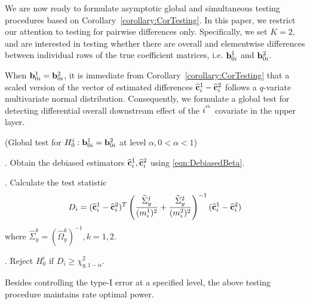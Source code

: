 We are now ready to formulate asymptotic global and simultaneous testing procedures based on Corollary~\ref{corollary:CorTesting}. In this paper, we restrict our attention to testing for pairwise differences only. Specifically, we set $K=2$, and are interested in testing whether there are overall and elementwise differences between individual rows of the true coefficient matrices, i.e. ${\bf{b}}_{0i}^1$ and ${\bf{b}}_{0i}^2$.

When ${\bf{b}}_{0 i}^1 = {\bf{b}}_{0 i}^2$, it is immediate from Corollary~\ref{corollary:CorTesting} that a scaled version of the vector of estimated differences $\widehat {{\bf{c}}}_i^1 - \widehat {{\bf{c}}}_i^2$ follows a $q$-variate multivariate normal distribution. Consequently, we formulate a global test for detecting differential overall downstream effect of the $i^{\operatorname*{^{\text{th}}}}$ covariate in the upper layer.

\begin{Algorithm}\label{algo:AlgoGlobalTest}
(Global test for $H_0^i: {\bf{b}}_{0 i}^1 = {\bf{b}}_{0 i}^2$ at level $\alpha, 0< \alpha< 1$)

. Obtain the debiased estimators $\widehat {{\bf{c}}}_i^1, \widehat {{\bf{c}}}_i^2$ using \eqref{eqn:DebiasedBeta}.

. Calculate the test statistic
%
$$
D_i = (\widehat {{\bf{c}}}_i^1 - \widehat {{\bf{c}}}_i^2)^T
\left( \frac{ \widehat \Sigma_y^1}{(m_i^1)^2} +
\frac{\widehat \Sigma_y^2}{(m_i^2)^2} \right)^{-1} (\widehat {{\bf{c}}}_i^1 - \widehat {{\bf{c}}}_i^2)
$$
%
where $\widehat \Sigma_y^k = (\widehat \Omega_y^k)^{-1}, k = 1,2$.

. Reject $H_0^i$ if $D_i \geq \chi^2_{q, 1-\alpha}$.
\end{Algorithm}

Besides controlling the type-I error at a specified level, the above testing procedure maintains rate optimal power.


